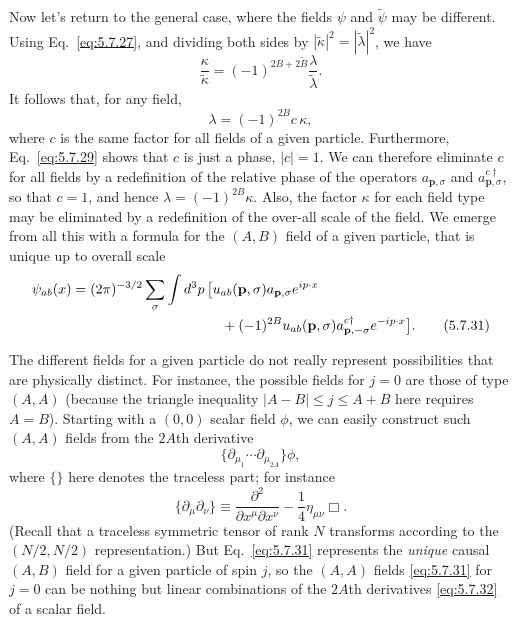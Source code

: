 Now let's return to the general case, where the fields $\psi$ and
$\widetilde\psi$ may be different. Using Eq.~\eqref{eq:5.7.27}, and dividing both sides
by $|\widetilde\kappa|^2=|\widetilde\lambda|^2$, we have
\[
\frac{\kappa}{\widetilde\kappa}=(-1)^{2B+2\widetilde B}
\frac{\lambda}{\widetilde\lambda}.
\]
It follows that, for any field,
\begin{equation}
\lambda=(-1)^{2B}c\,\kappa,
\tag{5.7.30}\label{eq:5.7.30}
\end{equation}
where $c$ is the same factor for all fields of a given particle. Furthermore,
Eq.~\eqref{eq:5.7.29} shows that $c$ is just a phase, $|c|=1$. We can therefore
eliminate $c$ for all fields by a redefinition of the relative phase of the
operators $a_{\mathbf p,\sigma}$ and $a^{c\dagger}_{\mathbf p,\sigma}$, so that
$c=1$, and hence $\lambda=(-1)^{2B}\kappa$. Also, the factor $\kappa$ for each
field type may be eliminated by a redefinition of the over-all scale of the
field. We emerge from all this with a formula for the $(A,B)$ field of a given
particle, that is unique up to overall scale
\begin{align}
\psi_{ab}(x)={}&(2\pi)^{-3/2}\sum_\sigma\int d^3p\,
\bigl[u_{ab}(\mathbf p,\sigma)a_{\mathbf p,\sigma}e^{ip\cdot x}
\notag\\
&\hspace{33mm}+(-1)^{2B}u_{ab}(\mathbf p,\sigma)
a^{c\dagger}_{\mathbf p,-\sigma}e^{-ip\cdot x}\bigr].
\tag{5.7.31}\label{eq:5.7.31}
\end{align}

The different fields for a given particle do not really represent
possibilities that are physically distinct. For instance, the possible fields
for $j=0$ are those of type $(A,A)$ (because the triangle inequality
$|A-B|\leq j\leq A+B$ here requires $A=B$). Starting with a $(0,0)$ scalar
field $\phi$, we can easily construct such $(A,A)$ fields from the $2A$th
derivative
\begin{equation}
\{\partial_{\mu_1}\cdots\partial_{\mu_{2A}}\}\phi,
\tag{5.7.32}\label{eq:5.7.32}
\end{equation}
where $\{\}$ here denotes the traceless part; for instance
\[
\{\partial_\mu\partial_\nu\}\equiv
\frac{\partial^2}{\partial x^\mu\partial x^\nu}
-\frac14\eta_{\mu\nu}\Box.
\]
(Recall that a traceless symmetric tensor of rank $N$ transforms according to
the $(N/2,N/2)$ representation.) But Eq.~\eqref{eq:5.7.31} represents the \emph{unique}
causal $(A,B)$ field for a given particle of spin $j$, so the $(A,A)$ fields
\eqref{eq:5.7.31} for $j=0$ can be nothing but linear combinations of the $2A$th
derivatives \eqref{eq:5.7.32} of a scalar field.

